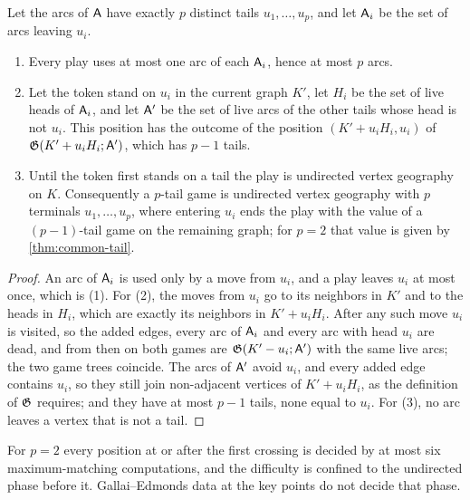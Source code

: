 \begin{lemma}[$p$ tails]\label{lem:p-tails}
Let the arcs of $\mathsf{A}$ have exactly $p$ distinct tails $u_1,\dots,u_p$, and let $\mathsf{A}_i$ be the set of arcs leaving $u_i$.
\begin{enumerate}[label=\textup{(\arabic*)}]
\item Every play uses at most one arc of each $\mathsf{A}_i$, hence at most $p$ arcs.
\item Let the token stand on $u_i$ in the current graph $K'$, let $H_i$ be the set of live heads of $\mathsf{A}_i$, and let $\mathsf{A}'$ be the set of live arcs of the other tails whose head is not $u_i$. This position has the outcome of the position $(K'+u_iH_i,u_i)$ of $\mathfrak{G}(K'+u_iH_i;\mathsf{A}')$, which has $p-1$ tails.
\item Until the token first stands on a tail the play is undirected vertex geography on $K$. Consequently a $p$-tail game is undirected vertex geography with $p$ terminals $u_1,\dots,u_p$, where entering $u_i$ ends the play with the value of a $(p-1)$-tail game on the remaining graph; for $p=2$ that value is given by \cref{thm:common-tail}.
\end{enumerate}
\end{lemma}
\begin{proof}
An arc of $\mathsf{A}_i$ is used only by a move from $u_i$, and a play leaves $u_i$ at most once, which is (1). For (2), the moves from $u_i$ go to its neighbors in $K'$ and to the heads in $H_i$, which are exactly its neighbors in $K'+u_iH_i$. After any such move $u_i$ is visited, so the added edges, every arc of $\mathsf{A}_i$ and every arc with head $u_i$ are dead, and from then on both games are $\mathfrak{G}(K'-u_i;\mathsf{A}')$ with the same live arcs; the two game trees coincide. The arcs of $\mathsf{A}'$ avoid $u_i$, and every added edge contains $u_i$, so they still join non-adjacent vertices of $K'+u_iH_i$, as the definition of $\mathfrak{G}$ requires; and they have at most $p-1$ tails, none equal to $u_i$. For (3), no arc leaves a vertex that is not a tail.
\end{proof}

For $p=2$ every position at or after the first crossing is decided by at most six maximum-matching computations, and the difficulty is confined to the undirected phase before it. Gallai--Edmonds data at the key points do not decide that phase.

